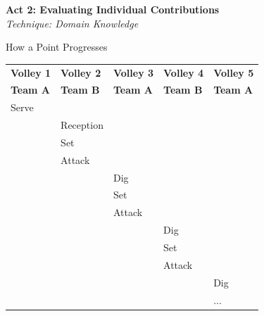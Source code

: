 \documentclass[handout]{beamer}
\begin{document}
\begin{frame}
  \centering
  {\color{riceblue} \bf Act 2: Evaluating Individual Contributions}\\
  {\color{ricegray} \it Technique: Domain Knowledge}
\end{frame}

\begin{frame}{How a Point Progresses}
  \centering
  \begin{tabular}{l|l|l|l|l}
    \bf Volley 1  & \bf Volley 2  & \bf Volley 3  & \bf Volley 4  & \bf Volley 5\\
    \bf Team A    & \bf Team B    & \bf Team A    & \bf Team B    & \bf Team A\\
    \hline
    Serve         &               &               &               &\\
                  & Reception     &               &               &\\
                  & Set           &               &               &\\
                  & Attack        &               &               &\\
                  &               & Dig           &               &\\
                  &               & Set           &               &\\
                  &               & Attack        &               &\\
                  &               &               & Dig           &\\
                  &               &               & Set           &\\
                  &               &               & Attack        &\\
                  &               &               &               & Dig\\
                  &               &               &               & ...
  \end{tabular}
\end{frame}
\end{document}

